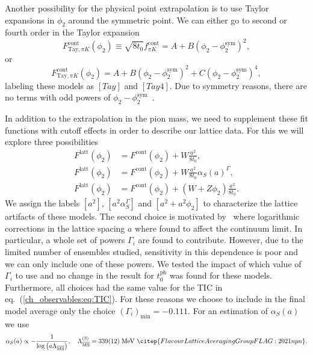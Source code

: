 Another possibility for the physical point extrapolation is to use Taylor expansions in $\phi_2$ around the symmetric point. We can either go to second or fourth order in the Taylor expansion
\begin{equation}
\label{ch_ss:eq:Tay}
F_{\textrm{Tay},\pi K}^{\textrm{cont}}(\phi_2)\equiv\sqrt{8t_0}f_{\pi K}^{\textrm{cont}}=A+B\left(\phi_2-\phi_2^{\textrm{sym}}\right)^2,
\end{equation}
or
\begin{equation}
\label{ch_ss:eq:Tay4}
F_{\textrm{Tay},\pi K}^{\textrm{cont}}(\phi_2)=A+B\left(\phi_2-\phi_2^{\textrm{sym}}\right)^2+C\left(\phi_2-\phi_2^{\textrm{sym}}\right)^4,
\end{equation}
labeling these models as $[Tay]$ and $[Tay4]$. Due to symmetry reasons, there are no terms with odd powers of $\phi_2-\phi_2^{\textrm{sym}}$~\citep{Bietenholz:2011qq}.

In addition to the extrapolation in the pion mass, we need to supplement these fit functions with cutoff effects in order to describe our lattice data. For this we will explore three possibilities
\begin{align}
\label{ch_ss:eq:a2}
F^{\textrm{latt}}(\phi_2)&=F^{\textrm{cont}}(\phi_2)+W\frac{a^2}{8t_0},\\
F^{\textrm{latt}}(\phi_2)&=F^{\textrm{cont}}(\phi_2)+W\frac{a^2}{8t_0}\alpha_S(a)^{\Gamma},\\
F^{\textrm{latt}}(\phi_2)&=F^{\textrm{cont}}(\phi_2)+\left(W+Z\phi_2\right)\frac{a^2}{8t_0}.
\end{align}
We assign the labels $[a^2]$, $[a^2\alpha_S^{\Gamma}]$ and $[a^2+a^2\phi_2]$ to characterize the lattice artifacts of these models. The second choice is motivated by~\citep{Husung:2022kvi} where logarithmic corrections in the lattice spacing $a$ where found to affect the continuum limit. In particular, a whole set of powers $\Gamma_i$ are found to contribute. However, due to the limited number of ensembles studied, sensitivity in this dependence is poor and we can only include one of these powers. We tested the impact of which value of $\Gamma_i$ to use and no change in the result for $t_0^{\textrm{ph}}$ was found for these models. Furthermore, all choices had the same value for the TIC in eq.~(\ref{ch_observables:eq:TIC}). For these reasons we choose to include in the final model average only the choice $\left(\Gamma_i\right)_{\textrm{min}}=-0.111$. For an estimation of $\alpha_S(a)$ we use
\begin{gather}
\alpha_S(a)\propto-\frac{1}{\textrm{log}\left(a\Lambda_{\overline{\textrm{MS}}}\right)}, \quad \Lambda_{\overline{\textrm{MS}}}^{(3)}=339(12)\;\textrm{MeV}~\citep{FlavourLatticeAveragingGroupFLAG:2021npn}.
\end{gather}

